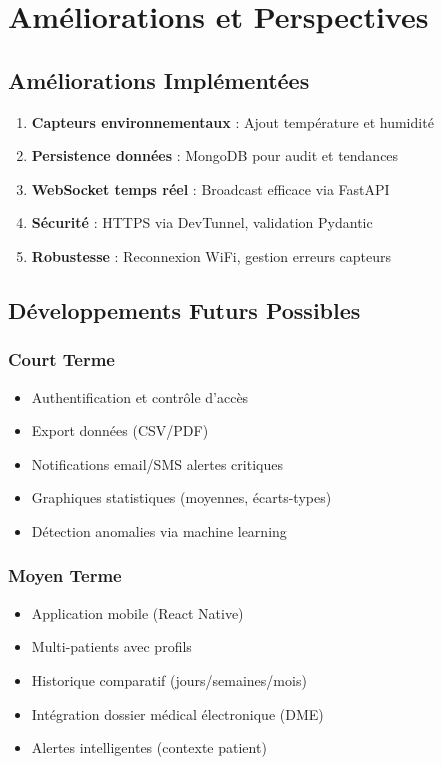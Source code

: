 \documentclass[12pt,french]{report}
\begin{document}
\chapter{Améliorations et Perspectives}

\section{Améliorations Implémentées}

\begin{enumerate}
    \item \textbf{Capteurs environnementaux} : Ajout température et humidité
    \item \textbf{Persistence données} : MongoDB pour audit et tendances
    \item \textbf{WebSocket temps réel} : Broadcast efficace via FastAPI
    \item \textbf{Sécurité} : HTTPS via DevTunnel, validation Pydantic
    \item \textbf{Robustesse} : Reconnexion WiFi, gestion erreurs capteurs
\end{enumerate}

\section{Développements Futurs Possibles}

\subsection{Court Terme}

\begin{itemize}
    \item Authentification et contrôle d'accès
    \item Export données (CSV/PDF)
    \item Notifications email/SMS alertes critiques
    \item Graphiques statistiques (moyennes, écarts-types)
    \item Détection anomalies via machine learning
\end{itemize}

\subsection{Moyen Terme}

\begin{itemize}
    \item Application mobile (React Native)
    \item Multi-patients avec profils
    \item Historique comparatif (jours/semaines/mois)
    \item Intégration dossier médical électronique (DME)
    \item Alertes intelligentes (contexte patient)
\end{itemize}
\end{document}
